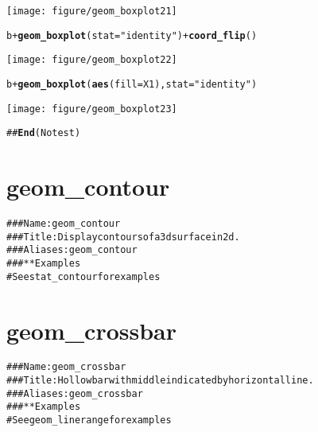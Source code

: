 \documentclass[a4paper,titlepage]{tufte-handout}\usepackage{graphicx, color}
\makeatletter
\def\maxwidth{ %
  \ifdim\Gin@nat@width>\linewidth
    \linewidth
  \else
    \Gin@nat@width
  \fi
}
\newcommand{\hlfunctioncall}[1]{\textcolor[rgb]{0.501960784313725,0,0.329411764705882}{\textbf{#1}}}%
\newcommand{\hlstring}[1]{\textcolor[rgb]{0.6,0.6,1}{#1}}%
\newcommand{\hlcomment}[1]{\textcolor[rgb]{0.180392156862745,0.6,0.341176470588235}{#1}}%
\newenvironment{kframe}{%
 \def\at@end@of@kframe{}%
 \ifinner\ifhmode%
  \def\at@end@of@kframe{\end{minipage}}%
  \begin{minipage}{\columnwidth}%
 \fi\fi%
 \def\FrameCommand##1{\hskip\@totalleftmargin \hskip-\fboxsep
 \colorbox{shadecolor}{##1}\hskip-\fboxsep
     \hskip-\linewidth \hskip-\@totalleftmargin \hskip\columnwidth}%
 \MakeFramed {\advance\hsize-\width
   \@totalleftmargin\z@ \linewidth\hsize
   \@setminipage}}%
 {\par\unskip\endMakeFramed%
 \at@end@of@kframe}
\newenvironment{knitrout}{}{} %
\makeatother
\begin{document}
\begin{knitrout}
\begin{kframe}
\begin{alltt}
\end{alltt}
\end{kframe}\texttt{[image: figure/geom\_boxplot21]} \begin{kframe}\begin{alltt}
b + \hlfunctioncall{geom_boxplot}(stat = \hlstring{"identity"}) + \hlfunctioncall{coord_flip}()
\end{alltt}
\end{kframe}\texttt{[image: figure/geom\_boxplot22]} \begin{kframe}\begin{alltt}
b + \hlfunctioncall{geom_boxplot}(\hlfunctioncall{aes}(fill = X1), stat = \hlstring{"identity"})
\end{alltt}
\end{kframe}\texttt{[image: figure/geom\_boxplot23]} \begin{kframe}\begin{alltt}
\hlcomment{## \hlfunctioncall{End}(No test)}
\end{alltt}
\end{kframe}
\end{knitrout}


\section{geom\_contour}

\begin{knitrout}
\color{fgcolor}\begin{kframe}
\begin{alltt}
\hlcomment{### Name: geom_contour}
\hlcomment{### Title: Display contours of a 3d surface in 2d.}
\hlcomment{### Aliases: geom_contour}
\hlcomment{### ** Examples}
\hlcomment{# See stat_contour for examples}
\end{alltt}
\end{kframe}
\end{knitrout}


\section{geom\_crossbar}

\begin{knitrout}
\color{fgcolor}\begin{kframe}
\begin{alltt}
\hlcomment{### Name: geom_crossbar}
\hlcomment{### Title: Hollow bar with middle indicated by horizontal line.}
\hlcomment{### Aliases: geom_crossbar}
\hlcomment{### ** Examples}
\hlcomment{# See geom_linerange for examples}
\end{alltt}
\end{kframe}
\end{knitrout}
\end{document}
